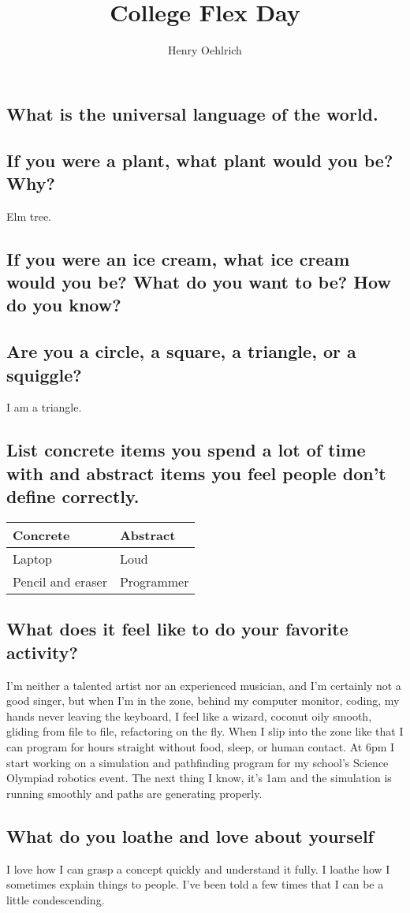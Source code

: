 \documentclass[12pt]{article}
\title{College Flex Day }
\author{Henry Oehlrich}
\begin{document}
\maketitle
\subsection*{What is the universal language of the world.}


\subsection*{If you were a plant, what plant would you be? Why?}
Elm tree.

\subsection*{If you were an ice cream, what ice cream would you be? What do you want to be? How do you know?}

\subsection*{Are you a circle, a square, a triangle, or a squiggle?}
I am a triangle.

\subsection*{List concrete items you spend a lot of time with and abstract items you feel people don't define correctly.}

\begin{tabular}{l|l}
    \toprule
    Concrete & Abstract \\
    \midrule
    Laptop & Loud \\
    Pencil and eraser & Programmer \\
\end{tabular}

\subsection*{What does it feel like to do your favorite activity?} 
I'm neither a talented artist nor an experienced musician, and I'm certainly
not a good singer, but when I'm in the zone, behind my computer monitor,
coding, my hands never leaving the keyboard, I feel like a wizard, coconut oily
smooth, gliding from file to file, refactoring on the fly. When I slip into the
zone like that I can program for hours straight without food, sleep, or human
contact. At 6pm I start working on a simulation and pathfinding program for my
school's Science Olympiad robotics event. The next thing I know, it's 1am and
the simulation is running smoothly and paths are generating properly.

\subsection*{What do you loathe and love about yourself}
I love how I can grasp a concept quickly and understand it fully. I loathe how
I sometimes explain things to people. I've been told a few times that I can be
a little condescending.
\end{document}

